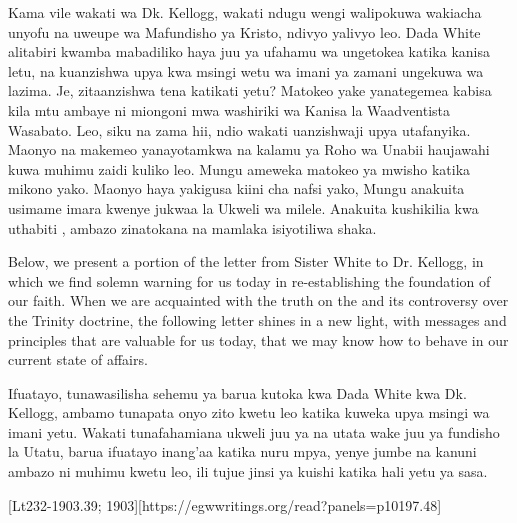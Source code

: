 Kama vile wakati wa Dk. Kellogg, wakati ndugu wengi walipokuwa wakiacha unyofu na uweupe wa Mafundisho ya Kristo, ndivyo yalivyo leo. Dada White alitabiri kwamba mabadiliko haya juu ya ufahamu wa  ungetokea katika kanisa letu, na kuanzishwa upya kwa msingi wetu wa imani ya zamani ungekuwa wa lazima. Je,  zitaanzishwa tena katikati yetu? Matokeo yake yanategemea kabisa kila mtu ambaye ni miongoni mwa washiriki wa Kanisa la Waadventista Wasabato. Leo, siku na zama hii, ndio wakati uanzishwaji upya utafanyika. Maonyo na makemeo yanayotamkwa na kalamu ya Roho wa Unabii haujawahi kuwa muhimu zaidi kuliko leo. Mungu ameweka matokeo ya mwisho katika mikono yako. Maonyo haya yakigusa kiini cha nafsi yako, Mungu anakuita usimame imara kwenye jukwaa la Ukweli wa milele. Anakuita kushikilia kwa uthabiti , ambazo zinatokana na mamlaka isiyotiliwa shaka.


Below, we present a portion of the letter from Sister White to Dr. Kellogg, in which we find solemn warning for us today in re-establishing the foundation of our faith. When we are acquainted with the truth on the  and its controversy over the Trinity doctrine, the following letter shines in a new light, with messages and principles that are valuable for us today, that we may know how to behave in our current state of affairs.


Ifuatayo, tunawasilisha sehemu ya barua kutoka kwa Dada White kwa Dk. Kellogg, ambamo tunapata onyo zito kwetu leo katika kuweka upya msingi wa imani yetu. Wakati tunafahamiana ukweli juu ya  na utata wake juu ya fundisho la Utatu, barua ifuatayo inang'aa katika nuru mpya, yenye jumbe na kanuni ambazo ni muhimu kwetu leo, ili tujue jinsi ya kuishi katika hali yetu ya sasa.






[Lt232-1903.39; 1903][https://egwwritings.org/read?panels=p10197.48]


